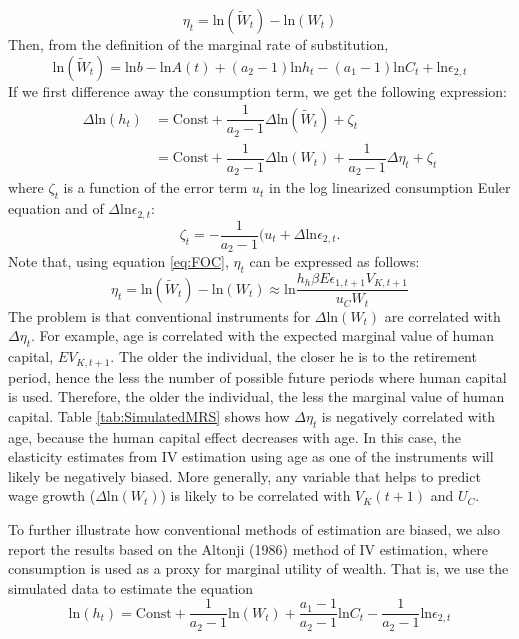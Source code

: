 \documentclass{article}
\begin{document}
      $$ \eta_t = \text{ln}(\tilde{W}_t) - \text{ln}(W_t) $$
    Then, from the definition of the marginal rate of substitution,
    $$  \text{ln}(\tilde{W}_t) =  \text{ln} b -  \text{ln} A(t) + (a_2 - 1)  \text{ln} h_t - (a_1 - 1)  \text{ln} C_t +  \text{ln} \epsilon_{2,t}$$
    If we first difference away the consumption term, we get the following expression:
    \begin{equation*}
      \begin{split}
        \Delta  \text{ln}(h_t) & = \text{Const} + \dfrac{1}{a_2 - 1} \Delta  \text{ln} (\tilde{W}_t) + \zeta_t \\
        & =  \text{Const} + \dfrac{1}{a_2 - 1} \Delta  \text{ln} (W_t) + \dfrac{1}{a_2 - 1} \Delta \eta_t + \zeta_t
           \end{split}
          \end{equation*}
        where $\zeta_t$ is a function of the error term $u_t$ in the log linearized consumption Euler equation and of $\Delta \text{ln} \epsilon_{2,t}$:
        $$ \zeta_t = -\dfrac{1}{a_2-1}(u_t + \Delta \text{ln} \epsilon_{2,t}.$$
        Note that, using equation \eqref{eq:FOC}, $\eta_t$ can be expressed as follows:
        $$ \eta_t = \text{ln} (\tilde{W}_t) -\text{ln} (W_t) \approx \text{ln} \dfrac{h_h \beta E \epsilon_{1,t+1} V_{K,t+1}}{u_C W_t}$$
        The problem is that conventional instruments for $\Delta \text{ln}(W_t)$ are correlated with $\Delta \eta_t$. For example, age is correlated with the expected marginal value of human capital, $E V_{K,t+1}$. The older the individual, the closer he is to the retirement period, hence the less the number of possible future periods where human capital is used. Therefore, the older the individual, the less the marginal value of human capital. Table \ref{tab:SimulatedMRS} shows how $\Delta \eta_t$ is negatively correlated with age, because the human capital effect decreases with age. In this case, the elasticity estimates from IV estimation using age as one of the instruments will likely be negatively biased. More generally, any variable that helps to predict wage growth ($\Delta \text{ln}(W_t)$) is likely to be correlated with $V_K (t + 1)$ and $U_C$. \par
        To further illustrate how conventional methods of estimation are biased, we also report the results based on the Altonji (1986) method of IV estimation, where consumption is used as a proxy for marginal utility of wealth. That is, we use the simulated data to estimate the equation
        $$ \text{ln}(h_t) = \text{Const} + \dfrac{1}{a_2 - 1} \text{ln}(W_t) + \dfrac{a_1 -1}{a_2 - 1} \text{ln} C_t - \dfrac{1}{a_2 - 1} \text{ln} \epsilon_{2,t}$$
\end{document}

